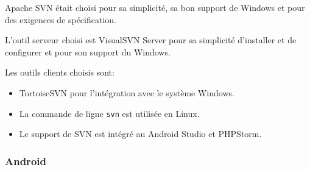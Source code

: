 Apache SVN était choisi pour sa simplicité, sa bon support de Windows et pour
des exigences de spécification. 

L'outil serveur choisi est VisualSVN Server pour sa simplicité d'installer et de
configurer et pour son support du Windows.

Les outils clients choisis sont:
\begin{itemize}
    \item TortoiseSVN pour l'intégration avec le système Windows.
    \item La commande de ligne \verb|svn| est utilisée en Linux.
    \item Le support de SVN est intégré au Android Studio et PHPStorm.
\end{itemize}

%
%

\subsubsection{Android}

